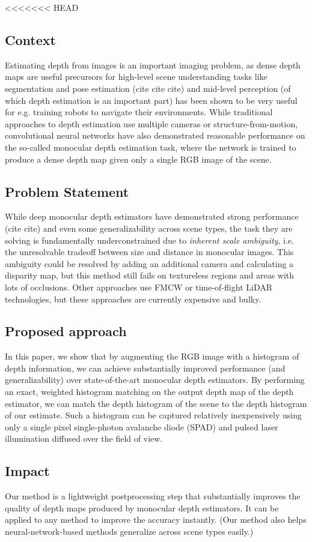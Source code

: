 <<<<<<< HEAD
%
\subsection{Context}
Estimating depth from images is an important imaging problem, as dense depth
maps are useful precursors for high-level scene understanding tasks like
segmentation and pose estimation (cite cite cite) and mid-level perception (of
which depth estimation is an important part) has been shown to be very useful
for e.g. training robots to navigate their environments. While traditional approaches to depth
estimation use multiple cameras or structure-from-motion, convolutional neural
networks have also demonstrated reasonable performance on the so-called
monocular depth estimation task, where the network is trained to produce a dense
depth map given only a single RGB image of the scene.
\subsection{Problem Statement}
While deep monocular depth estimators have demonstrated strong performance (cite
cite) and even some generalizability across scene types, the task they are solving is fundamentally
underconstrained due to \textit{inherent scale ambiguity}, i.e. the unresolvable
tradeoff between size and distance in monocular images. This ambiguity could be
resolved by adding an additional camera and calculating a disparity map, but
this method still fails on textureless regions and areas with lots of
occlusions. Other approaches use FMCW or time-of-flight LiDAR technologies,
but these approaches are currently expensive and bulky. 
\subsection{Proposed approach}
In this paper, we show that by augmenting the RGB image with a histogram of
depth information, we can achieve substantially improved performance
(and generalizability) over state-of-the-art monocular depth
estimators. By performing an exact, weighted histogram matching on the output
depth map of the depth estimator, we can match the depth histogram of the scene
to the depth histogram of our estimate. Such a histogram can be captured
relatively inexpensively using only a single pixel single-photon avalanche diode
(SPAD) and pulsed laser illumination diffused over the field of view.
\subsection{Impact}
Our method is a lightweight postprocessing step that substantially improves
the quality of depth maps produced by monocular depth estimators. It can be
applied to any method to improve the accuracy instantly. (Our method also
helps neural-network-based methods generalize across scene types easily.)
